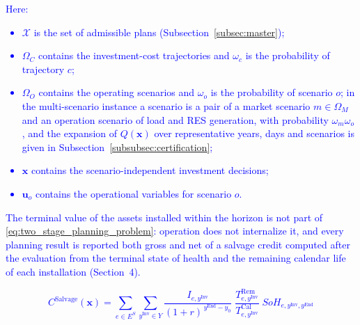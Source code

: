 \noindent
\textcolor{blue}{
    Here:
    \begin{itemize}
        \item $\mathcal{X}$ is the set of admissible plans (Subsection~\ref{subsec:master});
        \item $\Omega_C$ contains the investment-cost trajectories and $\omega_c$ is the probability of trajectory $c$;
        \item $\Omega_O$ contains the operating scenarios and $\omega_o$ is the probability of scenario $o$; in the
        multi-scenario instance a scenario is a pair of a market scenario $m \in \Omega_M$ and an operation scenario
        of load and RES generation, with probability $\omega_m \omega_o$, and the expansion of $Q(\boldsymbol{x})$
        over representative years, days and scenarios is given in Subsection~\ref{subsubsec:certification};
        \item $\boldsymbol{x}$ contains the scenario-independent investment decisions;
        \item $\boldsymbol{u}_o$ contains the operational variables for scenario $o$.
    \end{itemize}
}

\textcolor{blue}{The terminal value of the assets installed within the horizon is not part of
\eqref{eq:two_stage_planning_problem}: operation does not internalize it, and every planning result is
reported both gross and net of a salvage credit computed after the evaluation from the terminal state of
health and the remaining calendar life of each installation (Section~4).}


\textcolor{blue}{
    \begin{equation}
        C^\text{Salvage}(\boldsymbol{x}) =
        \sum_{e \in E^S} \sum_{y^\text{Inv} \in Y}
        \frac{I_{e,y^\text{Inv}}}{(1+r)^{\,y^\text{End}-y_0}}
        \;\frac{T^\text{Rem}_{e,y^\text{Inv}}}{T^\text{Cal}_{e,y^\text{Inv}}}
        \; SoH_{e,y^\text{Inv},y^\text{End}}
        \label{eq:salvage_credit}
    \end{equation}
}


